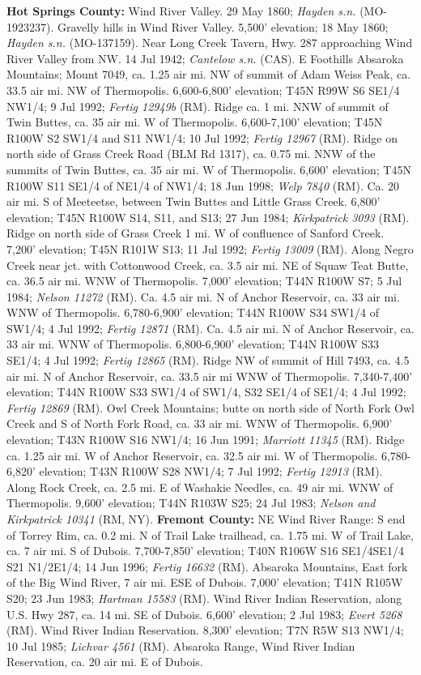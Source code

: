 \textbf{Hot Springs County:} Wind River Valley. 29 May 1860; \textit{Hayden s.n.} (MO-1923237).  Gravelly hills in Wind River Valley. 5,500' elevation; 18 May 1860; \textit{Hayden s.n.} (MO-137159).  Near Long Creek Tavern, Hwy. 287 approaching Wind River Valley from NW. 14 Jul 1942; \textit{Cantelow s.n.} (CAS). E Foothills Absaroka Mountains; Mount 7049, ca. 1.25 air mi. NW of summit of Adam Weiss Peak, ca. 33.5 air mi. NW of Thermopolis. 6,600-6,800' elevation; T45N R99W S6 SE1/4 NW1/4; 9 Jul 1992; \textit{Fertig 12949b} (RM).  Ridge ca. 1 mi. NNW of summit of Twin Buttes, ca. 35 air mi. W of Thermopolis. 6,600-7,100' elevation; T45N R100W S2 SW1/4 and S11 NW1/4; 10 Jul 1992; \textit{Fertig 12967} (RM).  Ridge on north side of Grass Creek Road (BLM Rd 1317), ca. 0.75 mi. NNW of the summits of Twin Buttes, ca. 35 air mi. W of Thermopolis. 6,600' elevation; T45N R100W S11 SE1/4 of NE1/4 of NW1/4; 18 Jun 1998; \textit{Welp 7840} (RM).  Ca. 20 air mi. S of Meeteetse, between Twin Buttes and Little Grass Creek. 6,800' elevation; T45N R100W S14, S11, and S13; 27 Jun 1984; \textit{Kirkpatrick 3093} (RM).  Ridge on north side of Grass Creek 1 mi. W of confluence of Sanford Creek. 7,200' elevation; T45N R101W S13; 11 Jul 1992; \textit{Fertig 13009} (RM).  Along Negro Creek near jct. with Cottonwood Creek, ca. 3.5 air mi. NE of Squaw Teat Butte, ca. 36.5 air mi. WNW of Thermopolis. 7,000' elevation; T44N R100W S7; 5 Jul 1984; \textit{Nelson 11272} (RM).  Ca. 4.5 air mi. N of Anchor Reservoir, ca. 33 air mi. WNW of Thermopolis. 6,780-6,900' elevation; T44N R100W S34 SW1/4 of SW1/4; 4 Jul 1992; \textit{Fertig 12871} (RM).  Ca. 4.5 air mi. N of Anchor Reservoir, ca. 33 air mi. WNW of Thermopolis. 6,800-6,900' elevation; T44N R100W S33 SE1/4; 4 Jul 1992; \textit{Fertig 12865} (RM).  Ridge NW of summit of Hill 7493, ca. 4.5 air mi. N of Anchor Reservoir, ca. 33.5 air mi WNW of Thermopolis. 7,340-7,400' elevation; T44N R100W S33 SW1/4 of SW1/4, S32 SE1/4 of SE1/4; 4 Jul 1992; \textit{Fertig 12869} (RM).  Owl Creek Mountains; butte on north side of North Fork Owl Creek and S of North Fork Road, ca. 33 air mi. WNW of Thermopolis. 6,900' elevation; T43N R100W S16 NW1/4; 16 Jun 1991; \textit{Marriott 11345} (RM).  Ridge ca. 1.25 air mi. W of Anchor Reservoir, ca. 32.5 air mi. W of Thermopolis. 6,780-6,820' elevation; T43N R100W S28 NW1/4; 7 Jul 1992; \textit{Fertig 12913} (RM).  Along Rock Creek, ca. 2.5 mi. E of Washakie Needles, ca. 49 air mi. WNW of Thermopolis. 9,600' elevation; T44N R103W S25; 24 Jul 1983; \textit{Nelson and Kirkpatrick 10341} (RM, NY).  \textbf{Fremont County:}  NE Wind River Range: S end of Torrey Rim, ca. 0.2 mi. N of Trail Lake trailhead, ca. 1.75 mi. W of Trail Lake, ca. 7 air mi. S of Dubois. 7,700-7,850' elevation; T40N R106W S16 SE1/4SE1/4 S21 N1/2E1/4; 14 Jun 1996; \textit{Fertig 16632} (RM).  Absaroka Mountains, East fork of the Big Wind River, 7 air mi. ESE of Dubois. 7,000' elevation; T41N R105W S20; 23 Jun 1983; \textit{Hartman 15583} (RM).  Wind River Indian Reservation, along U.S. Hwy 287, ca. 14 mi. SE of Dubois. 6,600' elevation; 2 Jul 1983; \textit{Evert 5268} (RM).  Wind River Indian Reservation. 8,300' elevation; T7N R5W S13 NW1/4; 10 Jul 1985; \textit{Lichvar 4561} (RM).  Absaroka Range, Wind River Indian Reservation, ca. 20 air mi. E of Dubois. 